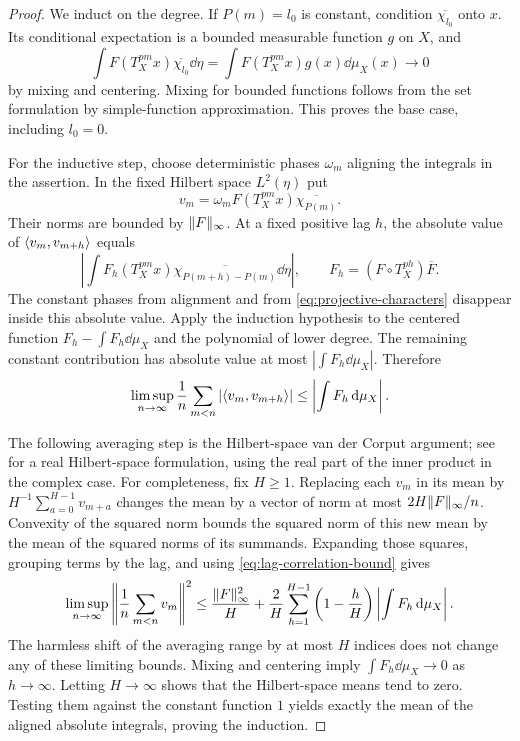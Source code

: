 \begin{proof}
We induct on the degree. If $P(m)=l_0$ is constant, condition
$\overline{\chi_{l_0}}$ onto $x$. Its conditional expectation is a
bounded measurable function $g$ on $X$, and
\[
 \int F(T_X^{pm}x)\overline{\chi_{l_0}}\dd\eta
   =\int F(T_X^{pm}x)g(x)\dd\mu_X(x)\longrightarrow0
\]
by mixing and centering. Mixing for bounded functions follows from the
set formulation by simple-function approximation. This proves the base
case, including $l_0=0$.

For the inductive step, choose deterministic phases $\omega_m$ aligning
the integrals in the assertion. In the fixed Hilbert space $L^2(\eta)$
put
\[
 v_m=\omega_m F(T_X^{pm}x)\overline{\chi_{P(m)}}.
\]
Their norms are bounded by $\lVert F\rVert_\infty$. At a fixed positive lag $h$,
the absolute value of $\langle v_m,v_{m+h}\rangle$ equals
\[
 \left|\int F_h(T_X^{pm}x)
       \overline{\chi_{P(m+h)-P(m)}}\dd\eta\right|,
 \qquad F_h=(F\circ T_X^{ph})\overline F.
\]
The constant phases from alignment and from
\eqref{eq:projective-characters} disappear inside this absolute value.
Apply the induction hypothesis to the centered function
$F_h-\int F_h\dd\mu_X$ and the polynomial of lower degree.
The remaining constant contribution has absolute value at most
$|\int F_h\dd\mu_X|$. Therefore
\begin{equation}
 \label{eq:lag-correlation-bound}
 \limsup_{n\to\infty}\frac1n\sum_{m<n}
       |\langle v_m,v_{m+h}\rangle|
 \le\left|\int F_h\,\mathrm d\mu_X\right|.
\end{equation}

The following averaging step is the Hilbert-space van der Corput
argument; see \cite[Theorem~4.1]{BergelsonKnutson2008} for a real
Hilbert-space formulation, using the real part of the inner product in
the complex case. For completeness, fix $H\ge1$. Replacing each $v_m$
in its mean by
$H^{-1}\sum_{a=0}^{H-1}v_{m+a}$ changes the mean by a vector of norm
at most $2H\lVert F\rVert_\infty/n$. Convexity of the squared norm bounds the
squared norm of this new mean by the mean of the squared norms of its
summands. Expanding those squares, grouping terms by the lag, and using
\eqref{eq:lag-correlation-bound} gives
\[
 \limsup_{n\to\infty}
 \left\lVert\frac1n\sum_{m<n}v_m\right\rVert^2
 \le\frac{\lVert F\rVert_\infty^2}{H}
    +\frac2H\sum_{h=1}^{H-1}
       \left(1-\frac hH\right)
       \left|\int F_h\,\mathrm d\mu_X\right|.
\]
The harmless shift of the averaging range by at most $H$ indices does
not change any of these limiting bounds. Mixing and centering imply
$\int F_h\dd\mu_X\to0$ as $h\to\infty$. Letting $H\to\infty$ shows
that the Hilbert-space means tend to zero.
Testing them against the constant function $1$ yields exactly the mean
of the aligned absolute integrals, proving the induction.
\end{proof}

